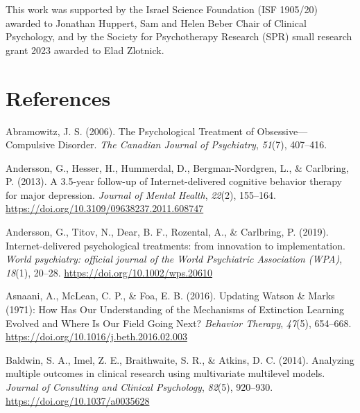 \documentclass[
  man,floatsintext]{apa7}
\newlength{\cslhangindent}
\newlength{\cslentryspacingunit} %
\newenvironment{CSLReferences}[2] %
 {%
  \setlength{\parindent}{0pt}
  \ifodd #1
  \let\oldpar\par
  \def\par{\hangindent=\cslhangindent\oldpar}
  \fi
  \setlength{\parskip}{#2\cslentryspacingunit}
 }%
 {}
\begin{document}
This work was supported by the Israel Science Foundation (ISF 1905/20) awarded to Jonathan Huppert, Sam and Helen Beber Chair of Clinical Psychology, and by the Society for Psychotherapy Research (SPR) small research grant 2023 awarded to Elad Zlotnick.

\newpage

\section{References}\label{references}

\hypertarget{refs}{}
\begin{CSLReferences}{1}{0}
\leavevmode{}%
Abramowitz, J. S. (2006). The Psychological Treatment of Obsessive---Compulsive Disorder. \emph{The Canadian Journal of Psychiatry}, \emph{51}(7), 407--416.

\leavevmode{}%
Andersson, G., Hesser, H., Hummerdal, D., Bergman-Nordgren, L., \& Carlbring, P. (2013). A 3.5-year follow-up of Internet-delivered cognitive behavior therapy for major depression. \emph{Journal of Mental Health}, \emph{22}(2), 155--164. \url{https://doi.org/10.3109/09638237.2011.608747}

\leavevmode{}%
Andersson, G., Titov, N., Dear, B. F., Rozental, A., \& Carlbring, P. (2019). Internet-delivered psychological treatments: from innovation to implementation. \emph{World psychiatry: official journal of the World Psychiatric Association (WPA)}, \emph{18}(1), 20--28. \url{https://doi.org/10.1002/wps.20610}

\leavevmode{}%
Asnaani, A., McLean, C. P., \& Foa, E. B. (2016). Updating Watson \& Marks (1971): How Has Our Understanding of the Mechanisms of Extinction Learning Evolved and Where Is Our Field Going Next? \emph{Behavior Therapy}, \emph{47}(5), 654--668. \url{https://doi.org/10.1016/j.beth.2016.02.003}

\leavevmode{}%
Baldwin, S. A., Imel, Z. E., Braithwaite, S. R., \& Atkins, D. C. (2014). Analyzing multiple outcomes in clinical research using multivariate multilevel models. \emph{Journal of Consulting and Clinical Psychology}, \emph{82}(5), 920--930. \url{https://doi.org/10.1037/a0035628}


\end{CSLReferences}
\end{document}
